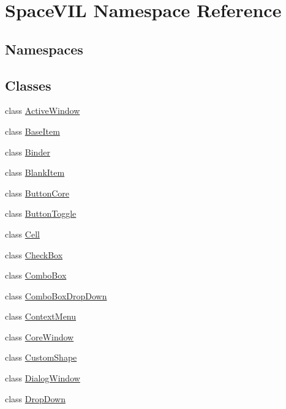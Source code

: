 \hypertarget{namespace_space_v_i_l}{}\section{Space\+V\+IL Namespace Reference}
\label{namespace_space_v_i_l}
\subsection*{Namespaces}
\begin{DoxyCompactItemize}
\end{DoxyCompactItemize}
\subsection*{Classes}
\begin{DoxyCompactItemize}
\item 
class \mbox{\hyperlink{class_space_v_i_l_1_1_active_window}{Active\+Window}}
\item 
class \mbox{\hyperlink{class_space_v_i_l_1_1_base_item}{Base\+Item}}
\item 
class \mbox{\hyperlink{class_space_v_i_l_1_1_binder}{Binder}}
\item 
class \mbox{\hyperlink{class_space_v_i_l_1_1_blank_item}{Blank\+Item}}
\item 
class \mbox{\hyperlink{class_space_v_i_l_1_1_button_core}{Button\+Core}}
\item 
class \mbox{\hyperlink{class_space_v_i_l_1_1_button_toggle}{Button\+Toggle}}
\item 
class \mbox{\hyperlink{class_space_v_i_l_1_1_cell}{Cell}}
\item 
class \mbox{\hyperlink{class_space_v_i_l_1_1_check_box}{Check\+Box}}
\item 
class \mbox{\hyperlink{class_space_v_i_l_1_1_combo_box}{Combo\+Box}}
\item 
class \mbox{\hyperlink{class_space_v_i_l_1_1_combo_box_drop_down}{Combo\+Box\+Drop\+Down}}
\item 
class \mbox{\hyperlink{class_space_v_i_l_1_1_context_menu}{Context\+Menu}}
\item 
class \mbox{\hyperlink{class_space_v_i_l_1_1_core_window}{Core\+Window}}
\item 
class \mbox{\hyperlink{class_space_v_i_l_1_1_custom_shape}{Custom\+Shape}}
\item 
class \mbox{\hyperlink{class_space_v_i_l_1_1_dialog_window}{Dialog\+Window}}
\item 
class \mbox{\hyperlink{class_space_v_i_l_1_1_drop_down}{Drop\+Down}}

\end{DoxyCompactItemize}
